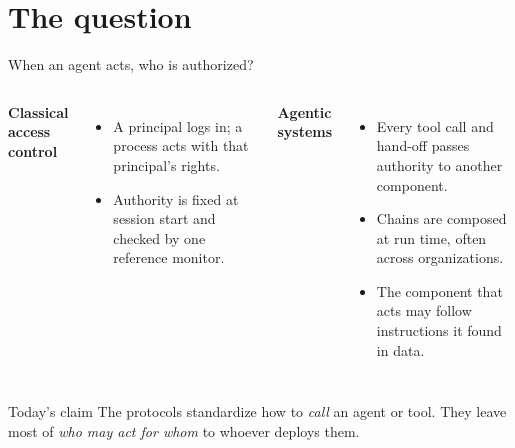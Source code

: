 \documentclass[aspectratio=169, 10pt]{beamer}
\begin{document}
\section{The question}

\begin{frame}{When an agent acts, who is authorized?}
  \begin{columns}[T]
    \textbf{Classical access control}
    \begin{itemize}\small
      \item A principal logs in; a process acts with that principal's rights.
      \item Authority is fixed at session start and checked by one reference monitor.
    \end{itemize}
    \textbf{Agentic systems}
    \begin{itemize}\small
      \item Every tool call and hand-off passes authority to another component.
      \item Chains are composed at run time, often across organizations.
      \item The component that acts may follow instructions it found in data.
    \end{itemize}
  \end{columns}
  \vspace{4mm}
  \begin{alertblock}{Today's claim}
    The protocols standardize how to \emph{call} an agent or tool. They leave most of
    \emph{who may act for whom} to whoever deploys them.
  \end{alertblock}
\end{frame}
\end{document}

